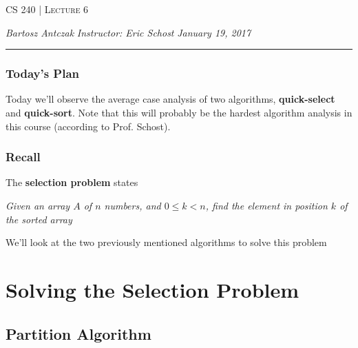\documentclass{report}
\newcommand{\lectureNum}{6}
\newcommand{\curDate}{January 19, 2017}
\newcommand{\course}{CS 240}
\begin{document}
\begin{center}
\begin{Large}
\textsc{\course{} | Lecture \lectureNum{}}
\end{Large}
\end{center} 
\noindent \textit{Bartosz Antczak} \hfill
\textit{Instructor: Eric Schost} \hfill
\textit{\curDate{}}
\rule{\textwidth}{0.4pt}

\subsubsection{Today's Plan}
Today we'll observe the average case analysis of two algorithms, \textbf{quick-select} and \textbf{quick-sort}. Note that this will probably be the hardest algorithm analysis in this course (according to Prof. Schost).
\subsubsection{Recall}
The \textbf{selection problem} states
\begin{center}
\textit{Given an array $A$ of $n$ numbers, and $0 \leq k < n$, find the element in position $k$ of the sorted array}
\end{center}
We'll look at the two previously mentioned algorithms to solve this problem
\section{Solving the Selection Problem}
\subsection{Partition Algorithm}
\end{document}
